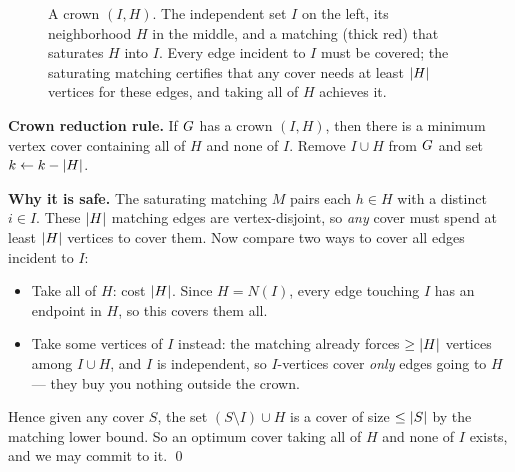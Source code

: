 \begin{figure}[H]
\centering
{}
\caption{A crown $(I,H)$. The independent set $I$ on the left, its neighborhood $H$ in the middle, and a matching (thick red) that saturates $H$ into $I$. Every edge incident to $I$ must be covered; the saturating matching certifies that any cover needs at least $\lvert H\rvert$ vertices for these edges, and taking all of $H$ achieves it.}
\label{ch25:fig-crown}
\end{figure}

\begin{focusbox}
\textbf{Crown reduction rule.} If $G$ has a crown $(I,H)$, then there is a minimum vertex cover containing all of $H$ and none of $I$. Remove $I\cup H$ from $G$ and set $k\gets k-\lvert H\rvert$.
\end{focusbox}

\begin{whybox}
\textbf{Why it is safe.} The saturating matching $M$ pairs each $h\in H$ with a distinct $i\in I$. These $\lvert H\rvert$ matching edges are vertex-disjoint, so \emph{any} cover must spend at least $\lvert H\rvert$ vertices to cover them. Now compare two ways to cover all edges incident to $I$:
\begin{itemize}
  \item Take all of $H$: cost $\lvert H\rvert$. Since $H=N(I)$, every edge touching $I$ has an endpoint in $H$, so this covers them all.
  \item Take some vertices of $I$ instead: the matching already forces $\ge \lvert H\rvert$ vertices among $I\cup H$, and $I$ is independent, so $I$-vertices cover \emph{only} edges going to $H$ --- they buy you nothing outside the crown.
\end{itemize}
Hence given any cover $S$, the set $(S\setminus I)\cup H$ is a cover of size $\le\lvert S\rvert$ by the matching lower bound. So an optimum cover taking all of $H$ and none of $I$ exists, and we may commit to it. \qed
\end{whybox}


